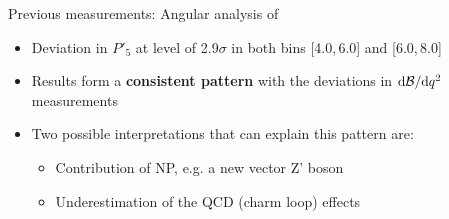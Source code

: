 \documentclass[aspectratio=1610]{beamer}
\begin{document}
\begin{frame}{Previous measurements: Angular analysis of \BdToKstmmP}

\begin{itemize}
    \item[\ding{80}] Deviation in $P'_{5}$ at level of 2.9$\sigma$ in both bins [4.0,\,6.0] and [6.0,\,8.0] \gevgevcccc
\end{itemize}

\begin{center}
\end{center}

\begin{itemize}
  \item[\ding{80}] Results form a {\bf consistent pattern} with the deviations in $\mathrm{d}{\mathcal{B}}/\mathrm{d}{q^2}$ measurements
  \item[\ding{80}] Two possible interpretations that can explain this pattern are:
  \begin{itemize}
    \item[\ding{182}] Contribution of NP, e.g. a new vector Z' boson
    \item[\ding{183}] Underestimation of the QCD (charm loop) effects 
  \end{itemize}
\end{itemize}
\end{frame}
\end{document}
